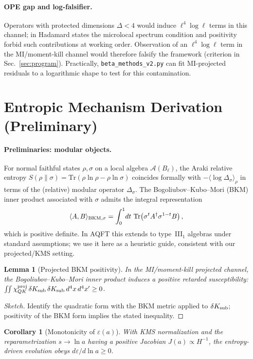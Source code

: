\documentclass[aps,prd,onecolumn,superscriptaddress,nofootinbib]{revtex4-2}
\newtheorem{lemma}{Lemma}
\newtheorem{corollary}{Corollary}
\begin{document}
\paragraph{OPE gap and log-falsifier.}
Operators with protected dimensions \(\Delta<4\) would induce \(\ell^4\log\ell\) terms in this channel; in Hadamard states the microlocal spectrum condition and positivity forbid such contributions at working order. Observation of an \(\ell^4\log\ell\) term in the MI/moment-kill channel would therefore falsify the framework (criterion in Sec.~\ref{sec:program}). Practically, \texttt{beta\_methods\_v2.py} can fit MI-projected residuals to a logarithmic shape to test for this contamination.

\section{Entropic Mechanism Derivation (Preliminary)}
\label{app:entropic-proof}

\paragraph{Preliminaries: modular objects.}
For normal faithful states \(\rho,\sigma\) on a local algebra \(\mathcal A(B_\ell)\), the Araki relative entropy
\(S(\rho\|\sigma)=\mathrm{Tr}(\rho\ln\rho-\rho\ln\sigma)\) coincides formally with \(-\langle \log\Delta_\sigma\rangle_\rho\) in terms of the (relative) modular operator \(\Delta_\sigma\). The Bogoliubov–Kubo–Mori (BKM) inner product associated with \(\sigma\) admits the integral representation
\[
\langle A,B\rangle_{\rm BKM,\sigma}=\int_0^1\!dt~\mathrm{Tr}\!\left(\sigma^t A^\dagger \sigma^{1-t}B\right),
\]
which is positive definite. In AQFT this extends to type~III\(_1\) algebras under standard assumptions; we use it here as a heuristic guide, consistent with our projected/KMS setting.

\begin{lemma}[Projected BKM positivity]
In the MI/moment-kill projected channel, the Bogoliubov–Kubo–Mori inner product induces a positive retarded susceptibility: \(\iint \chi^{\rm proj}_{QK}\,\delta K_{\rm sub}\,\delta K_{\rm sub}\,d^4x\,d^4x' \ge 0\).
\end{lemma}
\begin{proof}[Sketch]
Identify the quadratic form with the BKM metric applied to \(\delta K_{\rm sub}\); positivity of the BKM form implies the stated inequality.
\end{proof}
\begin{corollary}[Monotonicity of \(\varepsilon(a)\)]
With KMS normalization and the reparametrization \(s\to\ln a\) having a positive Jacobian \(J(a)\propto H^{-1}\), the entropy-driven evolution obeys \(d\varepsilon/d\ln a\ge 0\).
\end{corollary}
\end{document}
